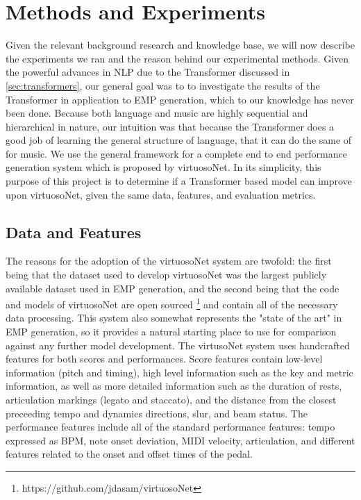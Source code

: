 \chapter{Methods and Experiments}\label{ch:ch4}
Given the relevant background research and knowledge base, we will now describe the experiments we ran and the reason behind our experimental methods. Given the powerful advances in NLP due to the Transformer discussed in \ref{sec:transformers}, our general goal was to to investigate the results of the Transformer in application to EMP generation, which to our knowledge has never been done. Because both language and music are highly sequential and hierarchical in nature, our intuition was that because the Transformer does a good job of learning the general structure of language, that it can do the same of for music. We use the general framework for a complete end to end performance generation system which is proposed by virtuosoNet. In its simplicity, this purpose of this project is to determine if a Transformer based model can improve upon virtuosoNet, given the same data, features, and evaluation metrics.

\section{Data and Features}
The reasons for the adoption of the virtuosoNet system are twofold: the first being that the dataset used to develop virtuosoNet was the largest publicly available dataset used in EMP generation, and the second being that the code and models of virtuosoNet are open sourced \footnote{https://github.com/jdasam/virtuosoNet} and contain all of the necessary data processing. This system also somewhat represents the "state of the art" in EMP generation, so it provides a natural starting place to use for comparison against any further model development. The virtusoNet system uses handcrafted features for both scores and performances. Score features contain low-level information (pitch and timing), high level information such as the key and metric information, as well as more detailed information such as the duration of rests, articulation markings (legato and staccato), and the distance from the closest preceeding tempo and dynamics directions, slur, and beam status. The performance features include all of the standard performance features: tempo expressed as BPM, note onset deviation, MIDI velocity, articulation, and different features related to the onset and offset times of the pedal. 

